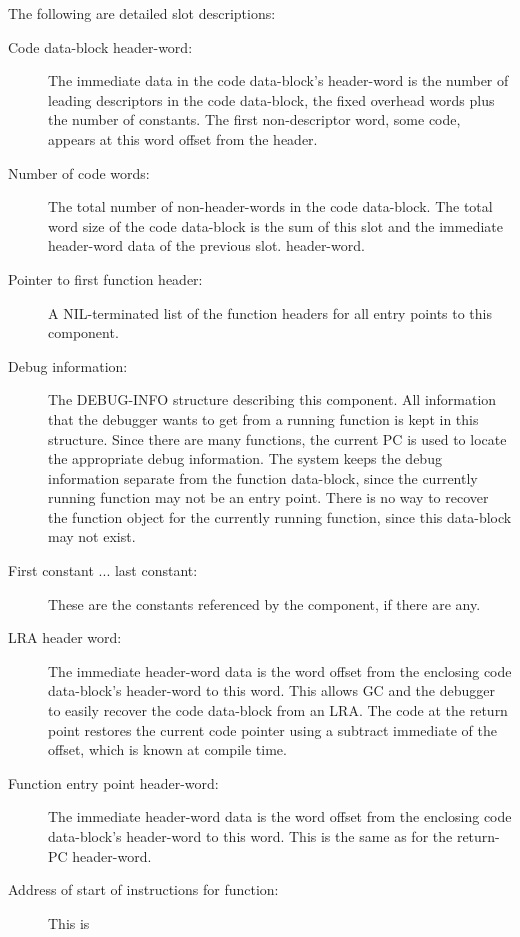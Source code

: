 The following are detailed slot descriptions:
\begin{description}
   \item[Code data-block header-word:]
      The immediate data in the code data-block's header-word is the number of
      leading descriptors in the code data-block, the fixed overhead words plus
      the number of constants.  The first non-descriptor word, some code,
      appears at this word offset from the header.
   \item[Number of code words:]
      The total number of non-header-words in the code data-block.  The total
      word size of the code data-block is the sum of this slot and the
      immediate header-word data of the previous slot.
      header-word.
   \item[Pointer to first function header:]
      A NIL-terminated list of the function headers for all entry points to
      this component.
   \item[Debug information:]
      The DEBUG-INFO structure describing this component.  All information that
      the debugger wants to get from a running function is kept in this
      structure.  Since there are many functions, the current PC is used to
      locate the appropriate debug information.  The system keeps the debug
      information separate from the function data-block, since the currently
      running function may not be an entry point.  There is no way to recover
      the function object for the currently running function, since this
      data-block may not exist.
   \item[First constant ... last constant:]
      These are the constants referenced by the component, if there are any.
\vspace{1ex}
   \item[LRA header word:]
      The immediate header-word data is the word offset from the enclosing code
      data-block's header-word to this word.  This allows GC and the debugger
      to easily recover the code data-block from an LRA.  The code at the
      return point restores the current code pointer using a subtract immediate
      of the offset, which is known at compile time.
\vspace{1ex}
   \item[Function entry point header-word:]
      The immediate header-word data is the word offset from the enclosing code
      data-block's header-word to this word.  This is the same as for the
      return-PC header-word.
   \item[Address of start of instructions for function:] This is

\end{description}
